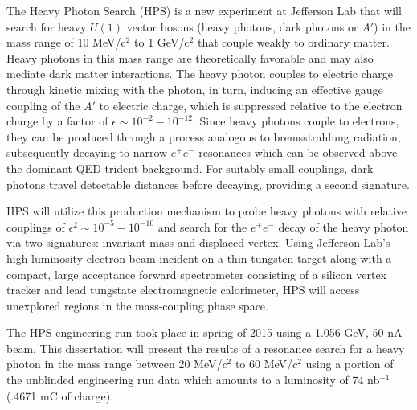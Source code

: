 The Heavy Photon Search (HPS) is a new experiment at Jefferson Lab that will 
search for heavy $U(1)$ vector bosons (heavy photons, dark photons or $A'$)
in the mass range of 10 MeV/c$^{2}$ to 1 GeV/c$^{2}$ that couple weakly to
ordinary matter.  Heavy photons in this mass range are theoretically favorable
and may also mediate dark matter interactions.  The heavy photon couples to 
electric charge through kinetic mixing with the photon, in turn, inducing an 
effective gauge coupling of the $A'$ to electric charge, which is suppressed
relative to the electron charge by a factor of 
$\epsilon \sim 10^{-2} - 10^{-12}$.  Since heavy photons couple to electrons, 
they can be produced through a process analogous to bremsstrahlung radiation, 
subsequently decaying to narrow $e^{+}e^{-}$ resonances which can be observed 
above the dominant QED trident background.  For suitably small couplings, dark
photons travel detectable distances before decaying, providing a second 
signature.

HPS will utilize this production mechanism to probe heavy photons with relative 
couplings of $\epsilon^2 \sim 10^{-5} - 10^{-10}$ and search for the 
$e^{+}e^{-}$ decay of the
heavy photon via two signatures: invariant mass and displaced vertex.  Using 
Jefferson Lab’s high luminosity electron beam incident on a thin tungsten target along with a compact, large 
acceptance forward spectrometer consisting of a silicon vertex tracker and lead
tungstate electromagnetic calorimeter, HPS will access unexplored regions in the
mass-coupling phase space. 

The HPS engineering run took place in spring of 2015 using a 1.056 GeV, 50 nA 
beam.  This dissertation will present the results of a resonance search for a heavy
photon in the mass range between 20 MeV/$c^2$ to 60 MeV/$c^2$ using a portion of the unblinded
engineering run data which amounts to a luminosity of 74 nb$^{-1}$
(.4671 mC of charge).
